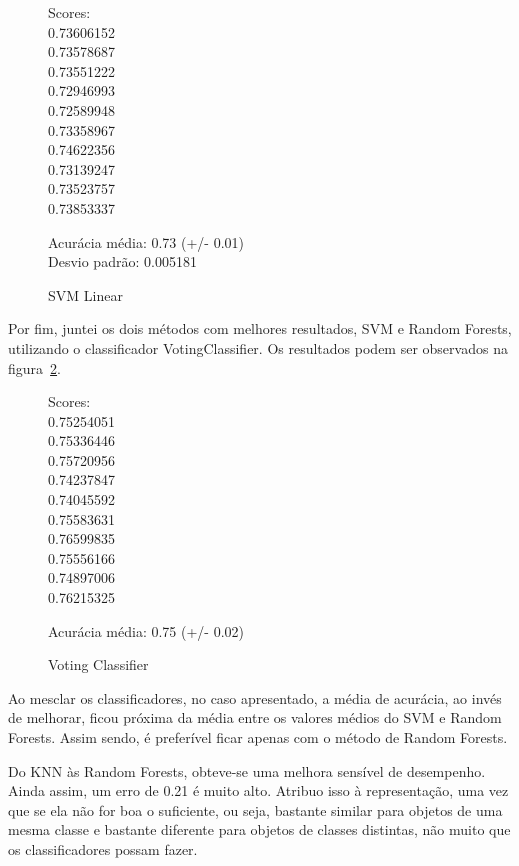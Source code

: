 \documentclass[conference]{IEEEtran}
\begin{document}
\begin{figure}[htb]\caption{SVM Linear}\label{fig:svm_linear}
  \begin{tt}\noindent
  \begin{multicols}{3}
Scores:\\
 0.73606152\\  0.73578687\\  0.73551222\\  0.72946993\\  0.72589948\\  0.73358967\\
  0.74622356\\  0.73139247\\  0.73523757\\  0.73853337\\
  \end{multicols}
Acurácia média: 0.73 (+/- 0.01)\\
Desvio padrão: 0.005181
  \end{tt}
\end{figure}

Por fim, juntei os dois métodos com melhores resultados, SVM e Random Forests, utilizando o classificador VotingClassifier. Os resultados podem ser observados na figura~\ref{fig:voting}.

\begin{figure}[htb]\caption{Voting Classifier}\label{fig:voting}
  \begin{tt}\noindent
  \begin{multicols}{3}
Scores:\\
0.75254051\\  0.75336446\\  0.75720956\\  0.74237847\\  0.74045592\\  0.75583631\\
  0.76599835\\  0.75556166\\  0.74897006\\  0.76215325\\
  \end{multicols}
Acurácia média: 0.75 (+/- 0.02)
  \end{tt}
\end{figure}

Ao mesclar os classificadores, no caso apresentado, a média de acurácia, ao
invés de melhorar, ficou próxima da média entre os valores médios do SVM e
Random Forests. Assim sendo, é preferível ficar apenas com o método de Random
Forests.

Do KNN às Random Forests, obteve-se uma melhora sensível de desempenho. Ainda
assim, um erro de 0.21 é muito alto. Atribuo isso à representação, uma vez que
se ela não for boa o suficiente, ou seja, bastante similar para objetos de uma
mesma classe e bastante diferente para objetos de classes distintas, não muito
que os classificadores possam fazer.
\end{document}
